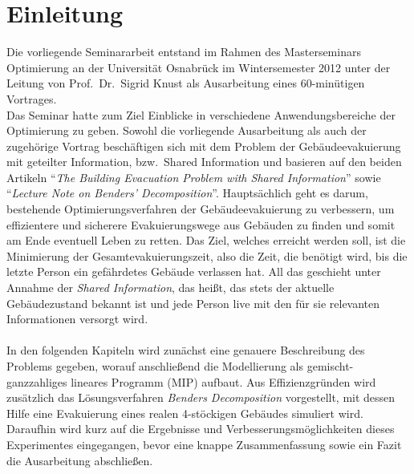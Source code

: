 \documentclass[a4paper, 11pt]{scrreprt}
\begin{document}
\newpage


\onehalfspacing
\thispagestyle{empty}

\tableofcontents

\chapter{Einleitung}
Die vorliegende Seminararbeit entstand im Rahmen des Masterseminars
Optimierung an der Universität Osnabrück im Wintersemester 2012
unter der Leitung von Prof.\ Dr.\ Sigrid Knust als Ausarbeitung eines
60-minütigen Vortrages.\\
Das Seminar hatte zum Ziel Einblicke in verschiedene Anwendungsbereiche der Optimierung zu geben.
Sowohl die vorliegende Ausarbeitung als auch der zugehörige Vortrag beschäftigen sich mit dem
Problem der Gebäudeevakuierung mit geteilter Information, bzw.\ Shared Information und basieren
auf den beiden Artikeln ``\textit{The Building Evacuation Problem with Shared Information}''\cite{bepsi}
sowie ``\textit{Lecture Note on Benders' Decomposition}''\cite{bender}.
Hauptsächlich geht es darum, bestehende Optimierungsverfahren der Gebäudeevakuierung
zu verbessern, um effizientere und sicherere Evakuierungswege aus Gebäuden zu finden und somit
am Ende eventuell Leben zu retten.
Das Ziel, welches erreicht werden soll, ist die Minimierung der Gesamtevakuierungszeit, also die Zeit,
die benötigt wird, bis die letzte Person ein gefährdetes Gebäude verlassen hat. All das geschieht unter
Annahme der \textit{Shared Information}, das heißt, das stets der aktuelle Gebäudezustand bekannt ist
und jede Person live mit den für sie relevanten Informationen versorgt wird.\\
\\
In den folgenden Kapiteln wird zunächst eine genauere Beschreibung des Problems gegeben, worauf
anschließend die Modellierung als gemischt-ganzzahliges lineares Programm (MIP) aufbaut.
Aus Effizienzgründen wird zusätzlich das Lösungsverfahren \textit{Benders Decomposition}
vorgestellt, mit dessen Hilfe eine Evakuierung eines realen 4-stöckigen Gebäudes simuliert wird.
Daraufhin wird kurz auf die Ergebnisse und Verbesserungsmöglichkeiten dieses Experimentes eingegangen,
bevor eine knappe Zusammenfassung sowie ein Fazit die Ausarbeitung abschließen.
\end{document}
